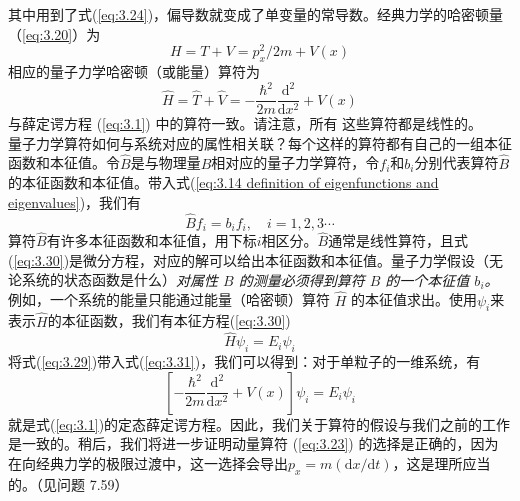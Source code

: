 	其中用到了式(\ref{eq:3.24})，偏导数就变成了单变量的常导数。经典力学的哈密顿量（\ref{eq:3.20}）为
	\begin{equation}
		H = T + V = p_x^2/2m+V\left(x\right)
		\label{eq:3.28}
	\end{equation}
	相应的量子力学哈密顿（或能量）算符为
	\begin{equation}
		\boxed{
			\hat{H} = \hat{T} + \hat{V} = -\frac{\hbar^2}{2m}\frac{\mathrm{d}^2}{\mathrm{d}x^2}+V\left(x\right)
		}
		\label{eq:3.29}
	\end{equation}
	与薛定谔方程 (\ref{eq:3.1}) 中的算符一致。请注意，所有
	这些算符都是线性的。\\
	\indent 量子力学算符如何与系统对应的属性相关联？每个这样的算符都有自己的一组本征函数和本征值。令$\hat{B}$是与物理量$B$相对应的量子力学算符，令$f_i$和$b_i$分别代表算符$\hat{B}$的本征函数和本征值。带入式(\ref{eq:3.14 definition of eigenfunctions and eigenvalues})，我们有
	\begin{equation}
		\hat{B}f_i = b_if_i, \quad i = 1,2,3\cdots
		\label{eq:3.30}
	\end{equation}
	算符$\hat{B}$有许多本征函数和本征值，用下标$i$相区分。$\hat{B}$通常是线性算符，且式(\ref{eq:3.30})是微分方程，对应的解可以给出本征函数和本征值。量子力学假设（无论系统的状态函数是什么）\textit{对属性 $B$ 的测量必须得到算符 $\hat{B}$ 的一个本征值 $b_i$。}例如，一个系统的能量只能通过能量（哈密顿）算符 $\hat{H}$ 的本征值求出。使用$\psi_i$来表示$\hat{H}$的本征函数，我们有本征方程(\ref{eq:3.30})
	\begin{equation}
		\boxed{
			\hat{H}\psi_i = E_i\psi_i
		}
		\label{eq:3.31}
	\end{equation}
	将式(\ref{eq:3.29})带入式(\ref{eq:3.31})，我们可以得到：对于单粒子的一维系统，有
	\begin{equation}
		\left[-\frac{\hbar^2}{2m}\frac{\mathrm{d}^2}{\mathrm{d}x^2}+V\left(x\right)\right]\psi_i = 
		E_i\psi_i
		\label{eq:3.32}
	\end{equation}
	就是式(\ref{eq:3.1})的定态薛定谔方程。因此，我们关于算符的假设与我们之前的工作是一致的。稍后，我们将进一步证明动量算符 (\ref{eq:3.23}) 的选择是正确的，因为在向经典力学的极限过渡中，这一选择会导出$p_x = m\left(\mathrm{d}x / \mathrm{d}t\right)$，这是理所应当的。（见问题 7.59）\\
